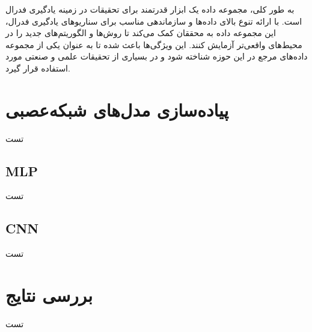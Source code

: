 
به طور کلی، مجموعه داده
یک ابزار قدرتمند برای تحقیقات در زمینه یادگیری فدرال است. با ارائه تنوع بالای داده‌ها و سازماندهی مناسب برای سناریوهای یادگیری فدرال، این مجموعه داده به محققان کمک می‌کند تا روش‌ها و الگوریتم‌های جدید را در محیط‌های واقعی‌تر آزمایش کنند. این ویژگی‌ها باعث شده تا
به عنوان یکی از مجموعه داده‌های مرجع در این حوزه شناخته شود و در بسیاری از تحقیقات علمی و صنعتی مورد استفاده قرار گیرد.



\section{پیاده‌سازی مدل‌های شبکه‌عصبی}
تست

\subsection{MLP}
تست

\subsection{CNN}
تست



\section{بررسی نتایج}
تست



